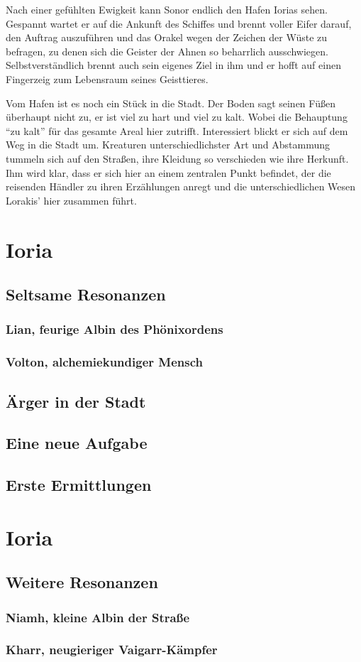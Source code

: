 \documentclass[a4paper]{scrreprt}
\begin{document}
Nach einer gefühlten Ewigkeit kann Sonor endlich den Hafen Iorias sehen.
Gespannt wartet er auf die Ankunft des Schiffes und brennt voller Eifer darauf, den Auftrag auszuführen und das Orakel wegen der Zeichen der Wüste zu befragen, zu denen sich die Geister der Ahnen so beharrlich ausschwiegen. Selbstverständlich brennt auch sein eigenes Ziel in ihm und er hofft auf einen Fingerzeig zum Lebensraum seines Geisttieres.

Vom Hafen ist es noch ein Stück in die Stadt. Der Boden sagt seinen Füßen überhaupt nicht zu, er ist viel zu hart und viel zu kalt. 
Wobei die Behauptung \enquote{zu kalt} für das gesamte Areal hier zutrifft.
Interessiert blickt er sich auf dem Weg in die Stadt um. Kreaturen unterschiedlichster Art und Abstammung tummeln sich auf den Straßen, ihre Kleidung so verschieden wie ihre Herkunft. Ihm wird klar, dass er sich hier an einem zentralen Punkt befindet, der die reisenden Händler zu ihren Erzählungen anregt und die unterschiedlichen Wesen Lorakis' hier zusammen führt. 

\chapter[Datum erstes Spiel]{Ioria}

\section{Seltsame Resonanzen}
\subsection{Lian, feurige Albin des Phönixordens}
\subsection{Volton, alchemiekundiger Mensch}

\section{Ärger in der Stadt}

\section{Eine neue Aufgabe}

\section{Erste Ermittlungen}


\chapter[Datum zweites Spiel]{Ioria}

\section{Weitere Resonanzen}
\subsection{Niamh, kleine Albin der Straße}
\subsection{Kharr, neugieriger Vaigarr-Kämpfer}
\end{document}
